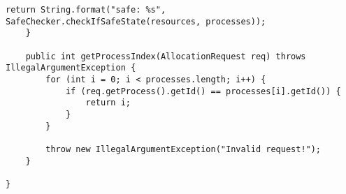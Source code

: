 \begin{enumerate}
\begin{lstlisting}[style=java]
        return String.format("safe: %s", SafeChecker.checkIfSafeState(resources, processes));
    }

    public int getProcessIndex(AllocationRequest req) throws IllegalArgumentException {
        for (int i = 0; i < processes.length; i++) {
            if (req.getProcess().getId() == processes[i].getId()) {
                return i;
            }
        }

        throw new IllegalArgumentException("Invalid request!");
    }

}

\end{lstlisting}

\end{enumerate}

